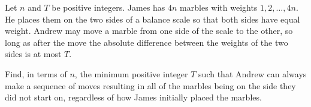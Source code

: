 Let $n$ and $T$ be positive integers. James has $4n$ marbles with weights $1, 2, \ldots, 4n$. He places them on the two sides of a balance scale so that both sides have equal weight. Andrew may move a marble from one side of the scale to the other, so long as after the move the absolute difference between the weights of the two sides is at most $T$.

Find, in terms of $n$, the minimum positive integer $T$ such that Andrew can always make a sequence of moves resulting in all of the marbles being on the side they did not start on, regardless of how James initially placed the marbles.
